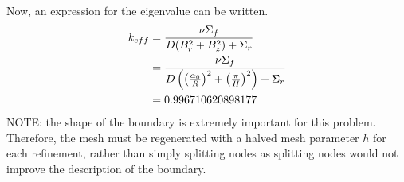   Now, an expression for the eigenvalue can be written.
  \begin{align}
    k_{eff} &= \frac{\nu \Sigma_f}{D(B_r^2 + B_z^2) + \Sigma_r} \\
    &= \frac{\nu \Sigma_f}{D\left(\left(\frac{\alpha_0}{R}\right)^2 + 
      \left(\frac{\pi}{H}\right)^2 \right) + \Sigma_r} \\
    &= 0.996710620898177
  \end{align}
  NOTE: the shape of the boundary is extremely important for this  problem.
  Therefore, the mesh must be regenerated with a halved mesh parameter  $h$ for
  each refinement, rather than simply splitting nodes as splitting nodes would 
  not improve the description of the boundary.
